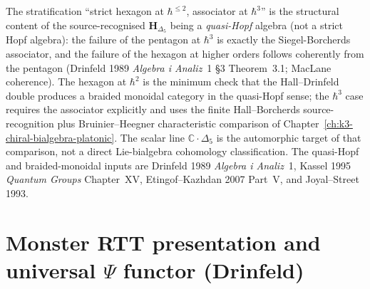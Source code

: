 \begin{remark}[Quasi-Hopf coherence: hexagon at \texorpdfstring{$\hbar\leq 2$}{hbar<= 2}, associator at \texorpdfstring{$\hbar^3$}{hbar-3}]
\label{rem:bfac-quasi-hopf-coherence}
The stratification ``strict hexagon at $\hbar^{\leq 2}$, associator
at $\hbar^3$'' is the structural content of the source-recognised
$\mathbf H_{\Delta_5}$ being a \emph{quasi-Hopf} algebra (not a strict
Hopf algebra): the
failure of the pentagon at $\hbar^3$ is exactly the Siegel-Borcherds
associator, and the failure of the hexagon at higher orders follows
coherently from the pentagon (Drinfeld 1989
\emph{Algebra i Analiz}~1 \S3 Theorem~3.1; MacLane coherence).
The hexagon at $\hbar^2$ is the minimum check that the
Hall--Drinfeld double produces a braided monoidal category in the
quasi-Hopf sense; the $\hbar^3$ case requires the associator
explicitly and uses the finite Hall--Borcherds source-recognition plus
Bruinier--Heegner characteristic comparison of
Chapter~\ref{ch:k3-chiral-bialgebra-platonic}. The scalar line
$\mathbb C\cdot\Delta_5$ is the automorphic target of that comparison,
not a direct Lie-bialgebra cohomology classification.
The quasi-Hopf and braided-monoidal inputs are Drinfeld 1989
\emph{Algebra i Analiz}~1, Kassel 1995 \emph{Quantum Groups}
Chapter~XV, Etingof--Kazhdan 2007 Part~V, and Joyal--Street 1993.
\end{remark}

\section{Monster RTT presentation and universal \texorpdfstring{$\Psi$}{Psi} functor (Drinfeld)}
\label{sec:bfac-monster-rtt-universal-psi}

